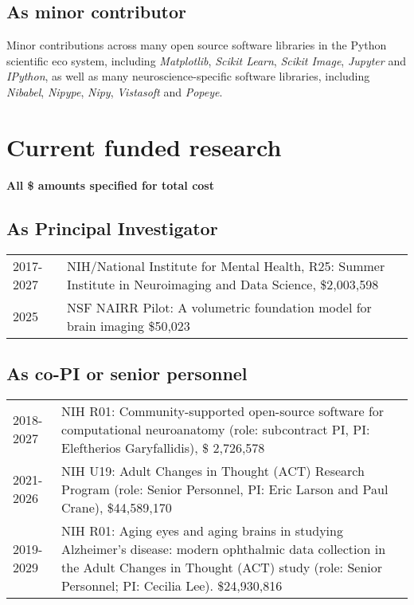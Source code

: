 \documentclass[11pt,fullpage]{article}
\begin{document}
  \subsection*{As minor contributor}
  Minor contributions across many open source software libraries in the Python
  scientific eco system, including \emph{Matplotlib}, \emph{Scikit Learn},
  \emph{Scikit Image}, \emph{Jupyter} and \emph{IPython}, as well as many neuroscience-specific software libraries, including \emph{Nibabel}, \emph{Nipype}, \emph{Nipy}, \emph{Vistasoft} and \emph{Popeye}.



\section*{Current funded research}

\textbf{All \$ amounts specified for total cost}

\subsection*{As Principal Investigator}
\begin{tabular}{p{}p{}}
2017-2027 & NIH/National Institute for Mental Health, R25: Summer Institute in Neuroimaging and Data Science, \$2,003,598\\
2025 & NSF NAIRR Pilot: A volumetric foundation model for brain imaging \$50,023 \\
\end{tabular}

\subsection*{As co-PI or senior personnel}
\begin{tabular}{p{}p{}}
2018-2027 & NIH R01: Community-supported open-source software for computational neuroanatomy (role: subcontract PI, PI: Eleftherios Garyfallidis), \$ 2,726,578 \\
2021-2026 & NIH U19: Adult Changes in Thought (ACT) Research Program (role: Senior Personnel, PI: Eric Larson and Paul Crane), \$44,589,170\\
2019-2029 & NIH R01: Aging eyes and aging brains in studying Alzheimer's disease: modern ophthalmic data collection in the Adult Changes in Thought (ACT) study (role: Senior Personnel; PI: Cecilia Lee). \$24,930,816  \\
\end{tabular}
\end{document}
